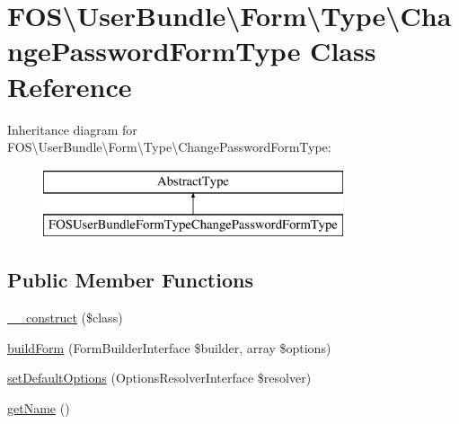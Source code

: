 \hypertarget{class_f_o_s_1_1_user_bundle_1_1_form_1_1_type_1_1_change_password_form_type}{\section{F\+O\+S\textbackslash{}User\+Bundle\textbackslash{}Form\textbackslash{}Type\textbackslash{}Change\+Password\+Form\+Type Class Reference}
\label{class_f_o_s_1_1_user_bundle_1_1_form_1_1_type_1_1_change_password_form_type}
}
Inheritance diagram for F\+O\+S\textbackslash{}User\+Bundle\textbackslash{}Form\textbackslash{}Type\textbackslash{}Change\+Password\+Form\+Type\+:\begin{figure}[H]
\begin{center}
\leavevmode
\includegraphics[height=2.000000cm]{class_f_o_s_1_1_user_bundle_1_1_form_1_1_type_1_1_change_password_form_type}
\end{center}
\end{figure}
\subsection*{Public Member Functions}
\begin{DoxyCompactItemize}
\item 
\hyperlink{class_f_o_s_1_1_user_bundle_1_1_form_1_1_type_1_1_change_password_form_type_a5df70adb3fe1a955440274a7142b7057}{\+\_\+\+\_\+construct} (\$class)
\item 
\hyperlink{class_f_o_s_1_1_user_bundle_1_1_form_1_1_type_1_1_change_password_form_type_a0ed9a5dc181cc6ab5239f7bf4ee9a194}{build\+Form} (Form\+Builder\+Interface \$builder, array \$options)
\item 
\hyperlink{class_f_o_s_1_1_user_bundle_1_1_form_1_1_type_1_1_change_password_form_type_adcd12c78dad2f4abd4ffebb39538568e}{set\+Default\+Options} (Options\+Resolver\+Interface \$resolver)
\item 
\hyperlink{class_f_o_s_1_1_user_bundle_1_1_form_1_1_type_1_1_change_password_form_type_a72076fa6b3351849551022a50938fcc3}{get\+Name} ()
\end{DoxyCompactItemize}


